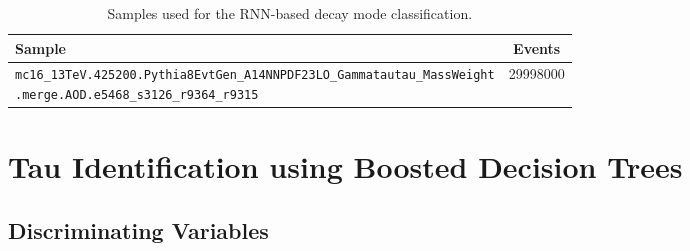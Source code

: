 \begin{table}[htbp]
  \centering
  {\small
  \begin{tabular}{p{13cm}S[table-format=8.0]}
    \toprule
    Sample & {Events} \\
    \midrule
    \texttt{mc16\_13TeV.425200.Pythia8EvtGen\_A14NNPDF23LO\_Gammatautau\_MassWeight\newline\hspace*{1em}.merge.AOD.e5468\_s3126\_r9364\_r9315} & 29998000 \\
    \bottomrule
  \end{tabular}
  }
  \caption[Samples used for the RNN-based decay mode classification]{Samples
    used for the RNN-based decay mode classification.}
  \label{tab:samples_mc16a_taus}
\end{table}

\clearpage
\section{Tau Identification using Boosted Decision Trees}
\label{app:tauid}
\subsection{Discriminating Variables}
\label{app:tauid_vars}

\FloatBarrier
